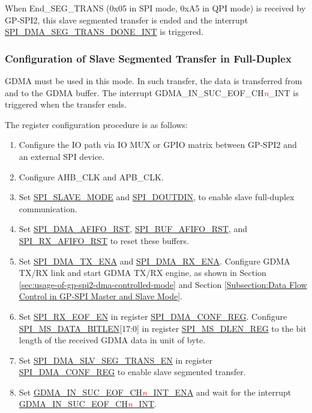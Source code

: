 \documentclass[main\_\_EN.tex]{subfiles}
\begin{document}
When End\_SEG\_TRANS (0x05 in SPI mode, 0xA5 in QPI mode) is received by GP-SPI2, this slave segmented transfer is ended and the interrupt \hyperref[int:SPIDMASEGTRANSDONEINT]{ SPI\_DMA\_SEG\_TRANS\_DONE\_INT} is triggered.

\subsubsection{Configuration of Slave Segmented Transfer in Full-Duplex}\label{sec:gp-spi2-slave-fd-seg-trans}

GDMA must be used in this mode. In such transfer, the data is transferred from and to the GDMA buffer. The interrupt GDMA\_IN\_SUC\_EOF\_CH\textcolor{red}{\it{n}}\_INT is triggered when the transfer ends.

The register configuration procedure is as follows:

\begin{enumerate}
   \item Configure the IO path via IO MUX or GPIO matrix between GP-SPI2 and an external SPI device.
   \item Configure AHB\_CLK and APB\_CLK.
    \item Set \hyperref[fielddesc:SPISLAVEMODE]{SPI\_SLAVE\_MODE} and \hyperref[fielddesc:SPIDOUTDIN]{SPI\_DOUTDIN}, to enable slave full-duplex communication.
    \item Set \hyperref[fielddesc:SPIDMAAFIFORST]{SPI\_DMA\_AFIFO\_RST}, \hyperref[fielddesc:SPIBUFAFIFORST]{SPI\_BUF\_AFIFO\_RST}, and \hyperref[fielddesc:SPIRXAFIFORST]{SPI\_RX\_AFIFO\_RST} to reset these buffers.
    \item Set \hyperref[fielddesc:SPIDMATXENA]{SPI\_DMA\_TX\_ENA} and \hyperref[fielddesc:SPIDMARXENA]{SPI\_DMA\_RX\_ENA}. Configure GDMA TX/RX link and start GDMA TX/RX engine, as shown in Section \ref{sec:usage-of-gp-spi2-dma-controlled-mode} and Section \ref{Subsection:Data Flow Control in GP-SPI Master and Slave Mode}.
    \item Set \hyperref[fielddesc:SPIRXEOFEN]{SPI\_RX\_EOF\_EN} in register \hyperref[regdesc:SPIDMACONFREG]{SPI\_DMA\_CONF\_REG}. Configure \hyperref[fielddesc:SPIMSDATABITLEN]{SPI\_MS\_DATA\_BITLEN}[17:0] in register \hyperref[regdesc:SPIMSDLENREG]{SPI\_MS\_DLEN\_REG} to the bit length of the received GDMA data in unit of byte.
    \item Set \hyperref[fielddesc:SPIDMASLVSEGTRANSEN]{SPI\_DMA\_SLV\_SEG\_TRANS\_EN} in register \hyperref[regdesc:SPIDMACONFREG]{SPI\_DMA\_CONF\_REG} to enable slave segmented transfer.
    \item Set \hyperref[fielddesc:AXIDMAINSUCEOFCHNINTENA]{GDMA\_IN\_SUC\_EOF\_CH\textcolor{red}{\it{n}}\_INT\_ENA} and wait for the interrupt \hyperref[int:GDMAINSUCEOFINT]{GDMA\_IN\_SUC\_EOF\_CH\textcolor{red}{\it{n}}\_INT}.
\end{enumerate}
\end{document}
